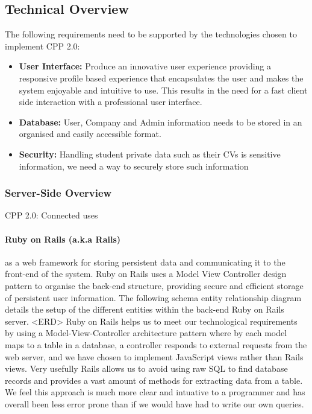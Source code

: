 \subsection{Technical Overview}
	The following requirements need to be supported by the technologies chosen to implement CPP 2.0:
		\begin{itemize}
		  \item \textbf{User Interface:} Produce an innovative user experience providing a responsive profile based experience that encapsulates the user and makes the system enjoyable and intuitive to use. This results in the need for a fast client side interaction with a professional user interface.
		  \item \textbf{Database:} User, Company and Admin information needs to be stored in an organised and easily accessible format.
		  \item \textbf{Security:} Handling student private data such as their CVs is sensitive information, we need a way to securely store such information 
		\end{itemize} 

	\subsubsection{Server-Side Overview}
		CPP 2.0: Connected uses
		\paragraph{Ruby on Rails (a.k.a Rails)\cite{ror}} as a web framework for storing persistent data and communicating it to the front-end of the system. Ruby on Rails uses a Model View Controller design pattern to organise the back-end structure, providing secure and efficient storage of persistent user information. The following schema entity relationship diagram details the setup of the different entities within the back-end Ruby on Rails server.
		<ERD>
		Ruby on Rails helps us to meet our technological requirements by using a Model-View-Controller architecture pattern where by each model maps to a table in a database, a controller responds to external requests from the web server, and we have chosen to implement JavaScript views rather than Rails views.
		Very usefully Rails allows us to avoid using raw SQL to find database records and provides a vast amount of methods for extracting data from a table. We feel this approach is much more clear and intuative to a programmer and has overall been less error prone than if we would have had to write our own queries. %

